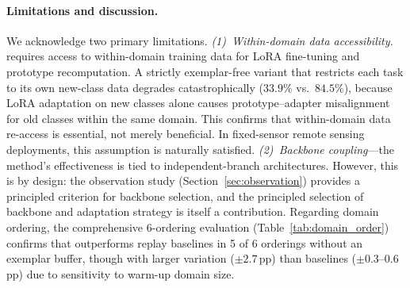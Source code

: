 \paragraph{Limitations and discussion.}
\label{sec:limitations}
We acknowledge two primary limitations.
\emph{(1)~Within-domain data accessibility.}
\methodname{} requires access to within-domain training data for LoRA fine-tuning and prototype recomputation.
A strictly exemplar-free variant that restricts each task to its own new-class data degrades catastrophically ($33.9\%$ vs.\ $84.5\%$), because LoRA adaptation on new classes alone causes prototype--adapter misalignment for old classes within the same domain.
This confirms that within-domain data re-access is essential, not merely beneficial.
In fixed-sensor remote sensing deployments, this assumption is naturally satisfied.
\emph{(2)~Backbone coupling}---the method's effectiveness is tied to independent-branch architectures. However, this is by design: the observation study (Section~\ref{sec:observation}) provides a principled criterion for backbone selection, and the principled selection of backbone and adaptation strategy is itself a contribution.
Regarding domain ordering, the comprehensive 6-ordering evaluation (Table~\ref{tab:domain_order}) confirms that \methodname{} outperforms replay baselines in 5 of 6 orderings without an exemplar buffer, though with larger variation ($\pm 2.7$\,pp) than baselines ($\pm 0.3$--$0.6$\,pp) due to sensitivity to warm-up domain size.
